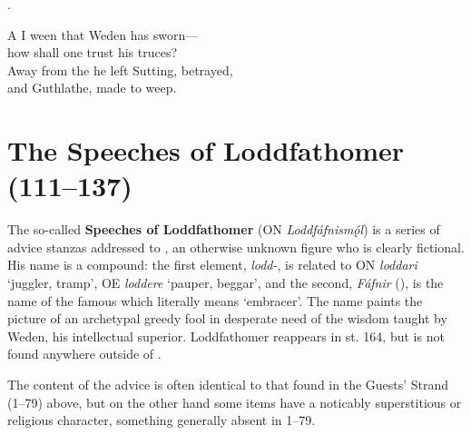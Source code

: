 \bvg\bva{}%
.\eva

\bvb A  I ween that Weden has sworn— \\
\ind how shall one trust his truces? \\
Away from the  he left Sutting, betrayed, \\
\ind and Guthlathe, made to weep.\evb\evg

\sectionline

\section{The Speeches of Loddfathomer (111–137)}

The so-called \textbf{Speeches of Loddfathomer} (ON \emph{Loddfáfnismǫ́l}) is a series of advice stanzas addressed to , an otherwise unknown figure who is clearly fictional.  His name is a compound: the first element, \emph{lodd-}, is related to ON \emph{loddari} ‘juggler, tramp’, OE \emph{loddere} ‘pauper, beggar’, and the second, \emph{Fáfnir} (), is the name of the famous  which literally means ‘embracer’.  The name paints the picture of an archetypal greedy fool in desperate need of the wisdom taught by Weden, his intellectual superior.  Loddfathomer reappears in st. 164, but is not found anywhere outside of \Havamal.

The content of the advice is often identical to that found in the Guests’ Strand (1–79) above, but on the other hand some items have a noticably superstitious or religious character, something generally absent in 1–79.

